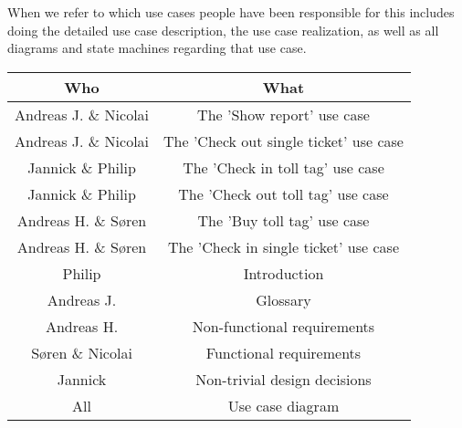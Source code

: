 When we refer to which use cases people have been responsible for this includes doing the detailed use case description, the use case realization, as well as all diagrams and state machines regarding that use case.

\begin{center}
\begin{tabular}[H]{|c|c|} 
\hline Who & What \\ 
\hline Andreas J. \& Nicolai & The 'Show report' use case \\ 
\hline Andreas J. \& Nicolai & The 'Check out single ticket' use case \\ 
\hline Jannick \& Philip & The 'Check in toll tag' use case \\ 
\hline Jannick \& Philip & The 'Check out toll tag' use case \\ 
\hline Andreas H. \& Søren & The 'Buy toll tag' use case  \\ 
\hline Andreas H. \& Søren & The 'Check in single ticket' use case \\
\hline Philip & Introduction \\ 
\hline Andreas J. & Glossary \\ 
\hline Andreas H. & Non-functional requirements \\ 
\hline Søren \& Nicolai & Functional requirements \\ 
\hline Jannick & Non-trivial design decisions \\ 
\hline All & Use case diagram \\ 
\hline 
\end{tabular} 
\end{center}